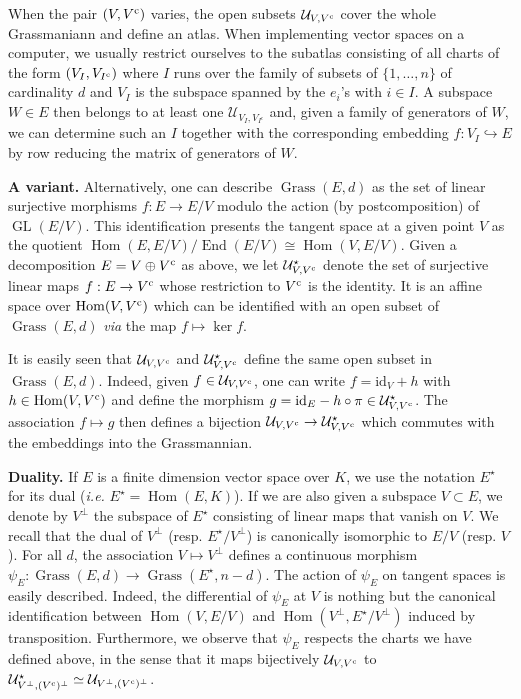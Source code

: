\documentclass{sig-alternate}
\DeclareMathOperator{\Hom}{Hom}
\DeclareMathOperator{\End}{End}
\DeclareMathOperator{\GL}{GL}
\DeclareMathOperator{\Grass}{Grass}
\newcommand{\id}{\textrm{id}}
\renewcommand{\c}{\text{\rm c}}
\begin{document}
When the pair $(V, V^\c)$ varies, the open subsets $\mathcal 
U_{V,V^\c}$ cover the whole Grassmaniann and define an atlas.
When implementing vector spaces on a computer, we usually restrict 
ourselves to the subatlas consisting of all charts of the form $(V_I, 
V_{I^\c})$ where $I$ runs over the family of subsets of $\{1, 
\ldots, n\}$ of cardinality $d$ and $V_I$ is the subspace spanned by 
the $e_i$'s with $i \in I$. A subspace $W \in E$ then belongs to at 
least one $\mathcal U_{V_I, V_{I^{\text{c}}}}$ and, given a family of
generators of $W$, we can determine such an $I$ together with the
corresponding embedding $f : V_I \hookrightarrow E$ by row reducing 
the matrix of generators of $W$.

\smallskip

\noindent
{\bf A variant.}
Alternatively, one can describe $\Grass(E,d)$ as the set of linear 
surjective morphisms $f : E \to E/V$ modulo the action (by 
postcomposition) of $\GL(E/V)$. This identification presents the 
tangent space at a given point $V$ as the quotient $\Hom(E, E/V) / 
\End(E/V) \cong \Hom(V, E/V)$.
Given a decomposition $E = V \oplus V^\c$ as above, we let $\mathcal 
U^\star_{V, V^\c}$ denote the set of surjective linear maps $f : E 
\to V^\c$ whose restriction to $V^\c$ is the identity. It is an 
affine space over $\Hom(V, V^\c)$ which can be identified with an open
subset of $\Grass(E,d)$ \emph{via} the map $f \mapsto \ker f$.

It is easily seen that $\mathcal U_{V, V^\c}$ and $\mathcal 
U^\star_{V, V^\c}$ define the same open subset in $\Grass(E,d)$. 
Indeed, given $f \in \mathcal U_{V, V^\c}$, one can write $f = \id_V 
+ h$ with $h \in \Hom(V, V^\c)$ and define the morphism $g = \id_E -
h \circ \pi \in \mathcal U^\star_{V, V^\c}$. The association $f \mapsto
g$ then defines a bijection $\mathcal U_{V, V^\c} \to \mathcal
U^\star_{V, V^\c}$ which commutes with the embeddings into the
Grassmannian.

\smallskip

\noindent
{\bf Duality.}
If $E$ is a finite dimension vector space over $K$, we use the notation 
$E^\star$ for its dual (\emph{i.e.} $E^\star = \Hom(E,K)$). If we are also given
a subspace $V \subset E$, we denote by $V^\perp$ the subspace 
of $E^\star$ consisting of linear maps that vanish on $V$. We recall
that the dual of $V^\perp$ (resp. $E^\star/V^\perp$) is canonically
isomorphic to $E/V$ (resp. $V$).
For all $d$, the association $V \mapsto V^\perp$ defines a continuous 
morphism $\psi_E : \Grass(E,d) \to \Grass(E^\star, n-d)$. The action of 
$\psi_E$ on tangent spaces is easily described. Indeed, the differential 
of $\psi_E$ at $V$ is nothing but the canonical identification between
$\Hom(V, E/V)$ and $\Hom(V^\perp, E^\star/V^\perp)$ induced by 
transposition. Furthermore, we observe that $\psi_E$ respects
the charts we have defined above, in the sense that it maps bijectively 
$\mathcal U_{V, V^\c}$ to $\mathcal U^\star_{V^\perp, (V^\c)^\perp}
\simeq \mathcal U_{V^\perp, (V^\c)^\perp}$.
\end{document}
